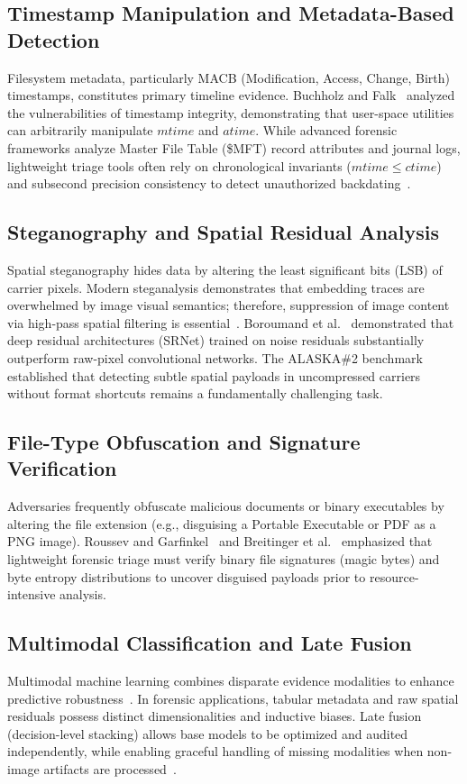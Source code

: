 \documentclass[conference]{IEEEtran}
\begin{document}
\subsection{Timestamp Manipulation and Metadata-Based Detection}
Filesystem metadata, particularly MACB (Modification, Access, Change, Birth) timestamps, constitutes primary timeline evidence. Buchholz and Falk~\cite{buchholz2004investigation} analyzed the vulnerabilities of timestamp integrity, demonstrating that user-space utilities can arbitrarily manipulate $mtime$ and $atime$. While advanced forensic frameworks analyze Master File Table (\$MFT) record attributes and journal logs, lightweight triage tools often rely on chronological invariants ($mtime \le ctime$) and subsecond precision consistency to detect unauthorized backdating~\cite{carrier2005file}.

\subsection{Steganography and Spatial Residual Analysis}
Spatial steganography hides data by altering the least significant bits (LSB) of carrier pixels. Modern steganalysis demonstrates that embedding traces are overwhelmed by image visual semantics; therefore, suppression of image content via high-pass spatial filtering is essential~\cite{fridrich2012rich}. Boroumand et al.~\cite{boroumand2019deep} demonstrated that deep residual architectures (SRNet) trained on noise residuals substantially outperform raw-pixel convolutional networks. The ALASKA\#2 benchmark~\cite{cogranne2020alaska} established that detecting subtle spatial payloads in uncompressed carriers without format shortcuts remains a fundamentally challenging task.

\subsection{File-Type Obfuscation and Signature Verification}
Adversaries frequently obfuscate malicious documents or binary executables by altering the file extension (e.g., disguising a Portable Executable or PDF as a PNG image). Roussev and Garfinkel~\cite{roussev2009file} and Breitinger et al.~\cite{breitinger2014approximate} emphasized that lightweight forensic triage must verify binary file signatures (magic bytes) and byte entropy distributions to uncover disguised payloads prior to resource-intensive analysis.

\subsection{Multimodal Classification and Late Fusion}
Multimodal machine learning combines disparate evidence modalities to enhance predictive robustness~\cite{baltrusaitis2019multimodal}. In forensic applications, tabular metadata and raw spatial residuals possess distinct dimensionalities and inductive biases. Late fusion (decision-level stacking) allows base models to be optimized and audited independently, while enabling graceful handling of missing modalities when non-image artifacts are processed~\cite{baltrusaitis2019multimodal}.
\end{document}
